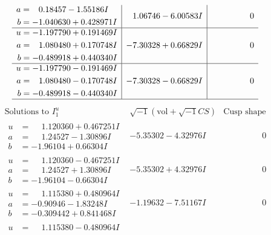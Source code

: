 \documentclass[1p]{elsarticle_modified}
\theoremstyle{definition}
\newcommand{\I}{\sqrt{-1}}
\begin{document}
$$\begin{array}{c|c|c}
\begin{aligned}
a &= \phantom{-}0.18457 - 1.55186 I \\
b &= -1.040630 + 0.428971 I\end{aligned}
 & \phantom{-}1.06746 - 6.00583 I & \phantom{-0.000000 } 0 \\ \hline\begin{aligned}
u &= -1.197790 + 0.191469 I \\
a &= \phantom{-}1.080480 + 0.170748 I \\
b &= -0.489918 + 0.440340 I\end{aligned}
 & -7.30328 + 0.66829 I & \phantom{-0.000000 } 0 \\ \hline\begin{aligned}
u &= -1.197790 - 0.191469 I \\
a &= \phantom{-}1.080480 - 0.170748 I \\
b &= -0.489918 - 0.440340 I\end{aligned}
 & -7.30328 - 0.66829 I & \phantom{-0.000000 } 0\\
 \hline 
 \end{array}$$\newpage$$\begin{array}{c|c|c}  
\text{Solutions to }I^u_{1}& \I (\text{vol} + \sqrt{-1}CS) & \text{Cusp shape}\\
 \hline 
\begin{aligned}
u &= \phantom{-}1.120360 + 0.467251 I \\
a &= \phantom{-}1.24527 - 1.30896 I \\
b &= -1.96104 + 0.66304 I\end{aligned}
 & -5.35302 - 4.32976 I & \phantom{-0.000000 } 0 \\ \hline\begin{aligned}
u &= \phantom{-}1.120360 - 0.467251 I \\
a &= \phantom{-}1.24527 + 1.30896 I \\
b &= -1.96104 - 0.66304 I\end{aligned}
 & -5.35302 + 4.32976 I & \phantom{-0.000000 } 0 \\ \hline\begin{aligned}
u &= \phantom{-}1.115380 + 0.480964 I \\
a &= -0.90946 - 1.83248 I \\
b &= -0.309442 + 0.841468 I\end{aligned}
 & -1.19632 - 7.51167 I & \phantom{-0.000000 } 0 \\ \hline\begin{aligned}
u &= \phantom{-}1.115380 - 0.480964 I \\

\end{aligned}
\end{array}$$
\end{document}
